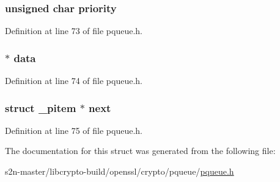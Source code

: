\subsubsection[{\texorpdfstring{priority}{priority}}]{\setlength{\rightskip}{0pt plus 5cm}unsigned char priority}\hypertarget{struct__pitem_aa60b3fab883b06b28d35213c80ce5566}{}\label{struct__pitem_aa60b3fab883b06b28d35213c80ce5566}


Definition at line 73 of file pqueue.\+h.

\subsubsection[{\texorpdfstring{data}{data}}]{ $\ast$ data}\hypertarget{struct__pitem_ac5c5967f62e5c3601479be651a8ed76c}{}\label{struct__pitem_ac5c5967f62e5c3601479be651a8ed76c}


Definition at line 74 of file pqueue.\+h.

\subsubsection[{\texorpdfstring{next}{next}}]{\setlength{\rightskip}{0pt plus 5cm}struct {\bf \+\_\+pitem} $\ast$ next}\hypertarget{struct__pitem_aa3360b2b2eda8aa41ad79e431f6f7ed1}{}\label{struct__pitem_aa3360b2b2eda8aa41ad79e431f6f7ed1}


Definition at line 75 of file pqueue.\+h.



The documentation for this struct was generated from the following file\+:\begin{DoxyCompactItemize}
\item 
s2n-\/master/libcrypto-\/build/openssl/crypto/pqueue/\hyperlink{crypto_2pqueue_2pqueue_8h}{pqueue.\+h}\end{DoxyCompactItemize}
